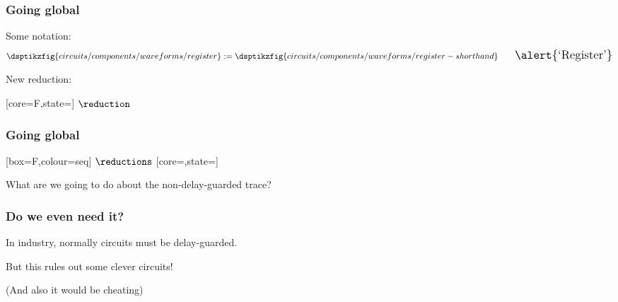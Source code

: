 \begin{frame}
    \frametitle{Going global}

    \centering
    \Large
    Some notation:
    \normalsize
    \begin{gather*}
        \dsptikzfig{circuits/components/waveforms/register}
        :=
        \dsptikzfig{circuits/components/waveforms/register-shorthand}
        \qquad
        \Large
        \text{\alert{`Register'}}
    \end{gather*}

    \vspace{1em}

    \pause

    New reduction:

    [core=F,state=]
    \Large\(\reduction\)\normalsize

\end{frame}
\begin{frame}
    \frametitle{Going global}

    \centering

    [box=F,colour=seq]
    \Large\(\reductions\)\normalsize
    [core=,state=]

    \pause
    \vspace{1em}

    \Large
    What are we going to do about the non-delay-guarded trace?

\end{frame}
\begin{frame}
    \frametitle{Do we even need it?}

    \centering

    In industry, normally circuits must be \alert{delay-guarded}.

    \pause

    But this rules out some \alert{clever} circuits!

    \vspace{0.5em}


    \pause

    \vspace{0.5em}

    \scriptsize
    (And also it would be cheating)

\end{frame}
